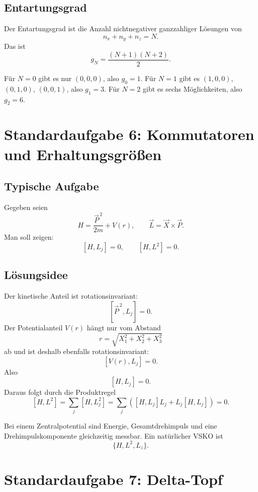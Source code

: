 \subsection{Entartungsgrad}

Der Entartungsgrad ist die Anzahl nichtnegativer ganzzahliger Lösungen von
\[
    n_x+n_y+n_z=N.
\]
Das ist
\[
    g_N=\frac{(N+1)(N+2)}{2}.
\]

\begin{examplebox}
Für $N=0$ gibt es nur $(0,0,0)$, also $g_0=1$. Für $N=1$ gibt es $(1,0,0)$, $(0,1,0)$, $(0,0,1)$, also $g_1=3$. Für $N=2$ gibt es sechs Möglichkeiten, also $g_2=6$.
\end{examplebox}

\section{Standardaufgabe 6: Kommutatoren und Erhaltungsgrößen}

\subsection{Typische Aufgabe}

Gegeben seien
\[
    H=\frac{\vec P^{\,2}}{2m}+V(r),
    \qquad
    \vec L=\vec X\times\vec P.
\]
Man soll zeigen:
\[
    [H,L_j]=0,
    \qquad
    [H,L^2]=0.
\]

\subsection{Lösungsidee}

Der kinetische Anteil ist rotationsinvariant:
\[
    [\vec P^{\,2},L_j]=0.
\]
Der Potentialanteil $V(r)$ hängt nur vom Abstand
\[
    r=\sqrt{X_1^2+X_2^2+X_3^2}
\]
ab und ist deshalb ebenfalls rotationsinvariant:
\[
    [V(r),L_j]=0.
\]
Also
\[
    [H,L_j]=0.
\]
Daraus folgt durch die Produktregel
\[
    [H,L^2]=\sum_j[H,L_j^2]
    =\sum_j\left([H,L_j]L_j+L_j[H,L_j]\right)=0.
\]

\begin{answerbox}
Bei einem Zentralpotential sind Energie, Gesamtdrehimpuls und eine Drehimpulskomponente gleichzeitig messbar. Ein natürlicher VSKO ist
\[
    \{H,L^2,L_z\}.
\]
\end{answerbox}

\section{Standardaufgabe 7: Delta-Topf}

